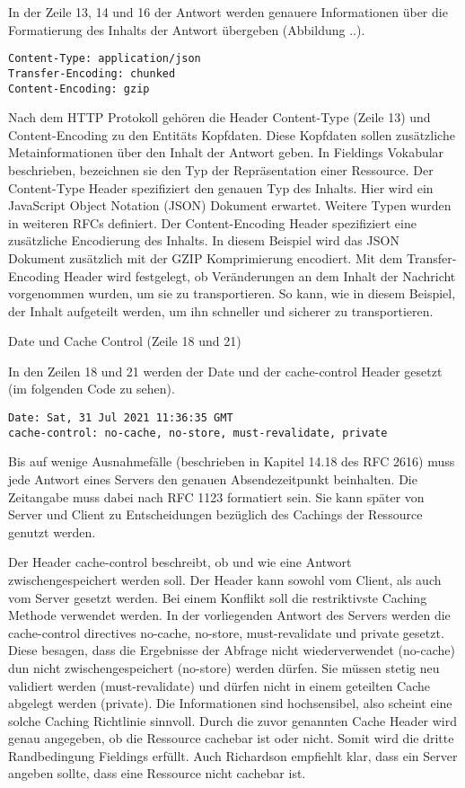 In der Zeile 13, 14 und 16 der Antwort werden genauere Informationen über die Formatierung des Inhalts der Antwort übergeben (Abbildung ..). 

\lstset{firstnumber=13}
\begin{lstlisting}
Content-Type: application/json
Transfer-Encoding: chunked
Content-Encoding: gzip
\end{lstlisting}

Nach dem HTTP Protokoll gehören die Header Content-Type (Zeile 13) und Content-Encoding zu den Entitäts Kopfdaten. Diese Kopfdaten sollen zusätzliche Metainformationen über den Inhalt der Antwort geben. In Fieldings Vokabular beschrieben, bezeichnen sie den Typ der Repräsentation einer Ressource. Der Content-Type Header spezifiziert den genauen Typ des Inhalts. Hier wird ein JavaScript Object Notation (JSON) Dokument erwartet. Weitere Typen wurden in weiteren RFCs definiert. Der Content-Encoding Header spezifiziert eine zusätzliche Encodierung des Inhalts. In diesem Beispiel wird das JSON Dokument zusätzlich mit der GZIP Komprimierung encodiert. Mit dem Transfer-Encoding Header wird festgelegt, ob Veränderungen an dem Inhalt der Nachricht vorgenommen wurden, um sie zu transportieren. So kann, wie in diesem Beispiel, der Inhalt aufgeteilt werden, um ihn schneller und sicherer zu transportieren.

Date und Cache Control (Zeile 18 und 21)

In den Zeilen 18 und 21 werden der Date und der cache-control Header gesetzt (im folgenden Code zu sehen).

\lstset{firstnumber=13}
\begin{lstlisting}
Date: Sat, 31 Jul 2021 11:36:35 GMT
cache-control: no-cache, no-store, must-revalidate, private
\end{lstlisting}

Bis auf wenige Ausnahmefälle (beschrieben in Kapitel 14.18 des RFC 2616) muss jede Antwort eines Servers den genauen Absendezeitpunkt beinhalten. Die Zeitangabe muss dabei nach RFC 1123 formatiert sein. Sie kann später von Server und Client zu Entscheidungen bezüglich des Cachings der Ressource genutzt werden.

Der Header cache-control beschreibt, ob und wie eine Antwort zwischengespeichert werden soll. Der Header kann sowohl vom Client, als auch vom Server gesetzt werden. Bei einem Konflikt soll die restriktivste Caching Methode verwendet werden. In der vorliegenden Antwort des Servers werden die cache-control directives no-cache, no-store, must-revalidate und private gesetzt. Diese besagen, dass die Ergebnisse der Abfrage nicht wiederverwendet (no-cache) dun nicht zwischengespeichert (no-store) werden dürfen. Sie müssen stetig neu validiert werden (must-revalidate) und dürfen nicht in einem geteilten Cache abgelegt werden (private). Die Informationen sind hochsensibel, also scheint eine solche Caching Richtlinie sinnvoll. Durch die zuvor genannten Cache Header wird genau angegeben, ob die Ressource cachebar ist oder nicht. Somit wird die dritte Randbedingung Fieldings erfüllt. Auch Richardson empfiehlt klar, dass ein Server angeben sollte, dass eine Ressource nicht cachebar ist.

